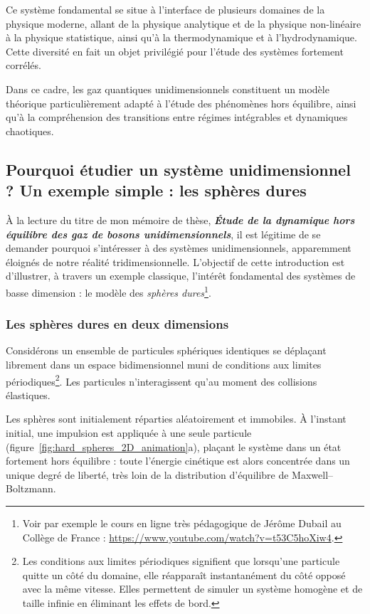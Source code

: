 Ce système fondamental se situe à l’interface de plusieurs domaines de la
physique moderne, allant de la physique analytique et de la physique
non-linéaire à la physique statistique, ainsi qu’à la thermodynamique et à
l’hydrodynamique. Cette diversité en fait un objet privilégié pour l’étude des
systèmes fortement corrélés.

Dans ce cadre, les gaz quantiques unidimensionnels constituent un modèle
théorique particulièrement adapté à l’étude des phénomènes hors équilibre,
ainsi qu’à la compréhension des transitions entre régimes intégrables et
dynamiques chaotiques.

\vspace{-0.5cm}
\subsection{Pourquoi étudier un système unidimensionnel ? Un exemple simple : les sphères dures}

À la lecture du titre de mon mémoire de thèse, \emph{\textbf{Étude de la dynamique hors équilibre des gaz de bosons unidimensionnels}}, il est légitime de se demander pourquoi s’intéresser à des systèmes unidimensionnels, apparemment éloignés de notre réalité tridimensionnelle. L’objectif de cette introduction est d’illustrer, à travers un exemple classique, l’intérêt fondamental des systèmes de basse dimension : le modèle des \emph{sphères dures}\footnote{Voir par exemple le cours en ligne très pédagogique de Jérôme Dubail au Collège de France :
    \url{https://www.youtube.com/watch?v=t53C5hoXiw4}.}.

\subsubsection{Les sphères dures en deux dimensions}

Considérons un ensemble de particules sphériques identiques se déplaçant
librement dans un espace bidimensionnel muni de conditions aux limites
périodiques\footnote{Les conditions aux limites périodiques signifient que
    lorsqu’une particule quitte un côté du domaine, elle réapparaît instantanément
    du côté opposé avec la même vitesse. Elles permettent de simuler un système
    homogène et de taille infinie en éliminant les effets de bord.}. Les particules
n’interagissent qu’au moment des collisions élastiques.

\smallskip

Les sphères sont initialement réparties aléatoirement et immobiles. À l’instant
initial, une impulsion est appliquée à une seule particule
(figure~\ref{fig:hard_spheres_2D_animation}a), plaçant le système dans un état
fortement hors équilibre : toute l’énergie cinétique est alors concentrée dans
un unique degré de liberté, très loin de la distribution d’équilibre de
Maxwell--Boltzmann.

